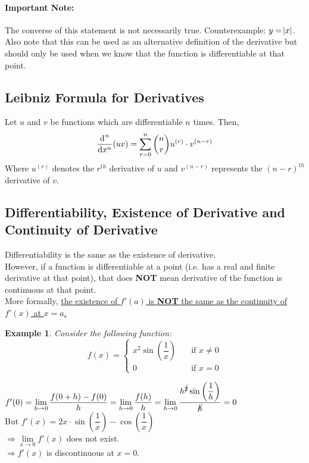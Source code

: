 \documentclass[14]{article}
\newtheorem*{ex}{Example}
\theoremstyle{definition}
\theoremstyle{case}
\begin{document}
\paragraph{Important Note:}The converse of this statement is not necessarily true. Counterexample: $y = \abs{x}$.
Also note that this can be used as an alternative definition of the derivative but should only be used when we know that the function is differentiable at that point.
\subsection{Leibniz Formula for Derivatives}
Let $u$ and $v$ be functions which are differentiable $n$ times. Then,\\
\[
\dfrac{\dif^{\;n}}{\dif x^n} (uv) = \sum\limits_{r=0}^{n} {n \choose r} u^{(r)} \cdot v^{(n - r)}
\]
Where $u^{(r)}$ denotes the $r^{th}$ derivative of $u$ and $v^{(n-r)}$ represents the $(n-r)^{th}$ derivative of $v$.
\subsection{Differentiability, Existence of Derivative and Continuity of Derivative}
Differentiability is the same as the existence of derivative.\\
However, if a function is differentiable at a point (i.e. has a real and finite derivative at that point), that does \textbf{NOT} mean derivative of the function is continuous at that point.\\
More formally, \underline{the existence of $f'(a)$ is \textbf{NOT} the same as the continuity of $f'(x)$ at $x = a$.}
\begin{ex}
Consider the following function:
\[
f(x) = \left\{
        \begin{array}{ll}
            x^2 \sin\left(\dfrac{1}{x}\right) & \quad \text{if } x \neq 0\\
            0 & \quad \text{if } x = 0 
        \end{array}
    \right.
\]
\end{ex}
$f'(0) = \lim\limits_{h \to 0} \dfrac{f(0+h) - f(0)}{h} = \lim\limits_{h \to 0} \dfrac{f(h)}{h} = \lim\limits_{h \to 0} \dfrac{h^{\cancel{2}} \sin\left(\dfrac{1}{h}\right)}{\cancel{h}} = 0$\\
But $f'(x) = 2x\cdot \sin\left(\dfrac{1}{x}\right) - \cos\left(\dfrac{1}{x}\right)\;$\\
$\Rightarrow \lim\limits_{x \to 0} f'(x)$ does not exist.\\
$\Rightarrow f'(x)$ is discontinuous at $x = 0$.
\pagebreak
\end{document}

